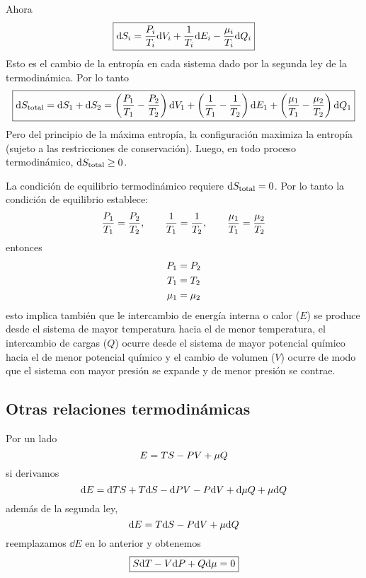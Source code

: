 Ahora
\begin{equation}
  \boxed{\dd S_i=\frac{P_i}{T_i}\dd V_i+\frac{1}{T_i}\dd E_i-\frac{\mu_i}{T_i}\dd Q_i}
\end{equation}
Esto es el cambio de la entropía en cada sistema dado por la segunda ley de la termodinámica. Por lo tanto
\begin{equation}
  \boxed{\dd S_{\rm total}=\dd S_1+\dd S_2=\left(\frac{P_1}{T_1}-\frac{P_2}{T_2}\right)\dd V_1+\left(\frac{1}{T_1}-\frac{1}{T_2}\right)\dd E_1+\left(\frac{\mu_1}{T_1}-\frac{\mu_2}{T_2}\right)\dd Q_1}
\end{equation}
Pero del principio de la máxima entropía, la configuración maximiza la entropía (sujeto a las restricciones de conservación). Luego, en todo proceso termodinámico, $\dd S_{\rm total}\geq 0$.

La condición de equilibrio termodinámico requiere $\dd S_{\rm total}=0$. Por lo tanto la condición de equilibrio establece:
\begin{equation}
  \frac{P_1}{T_1}=\frac{P_2}{T_2},\qquad \frac{1}{T_1}=\frac{1}{T_2},\qquad \frac{\mu_1}{T_1}=\frac{\mu_2}{T_2}
\end{equation}
entonces
\begin{align}
  P_1&=P_2\\
   T_1&=T_2\\
    \mu_1&=\mu_2
\end{align}
esto implica también que le intercambio de energía interna o calor ($E$) se produce desde el sistema de mayor temperatura hacia el de menor temperatura, el intercambio de cargas ($Q$) ocurre desde el sistema de mayor potencial químico hacia el de menor potencial químico y el cambio de volumen ($V$)  ocurre de modo que el sistema con mayor presión se expande y de menor presión se contrae.

\subsection{Otras relaciones termodinámicas}
Por un lado
\begin{equation}
  E=TS-PV+\mu Q
\end{equation}
si derivamos
\begin{equation}
  \dd E=\dd TS+T\dd S-\dd PV-P\dd V+\dd\mu Q+\mu \dd Q
\end{equation}
además de la segunda ley,
\begin{equation}
  \dd E=T\dd S-P\dd V+\mu \dd Q
\end{equation}
reemplazamos $\dd E$ en lo anterior y obtenemos
\begin{equation}
  \boxed{S\dd T-V\dd P+Q\dd\mu =0}
\end{equation}

